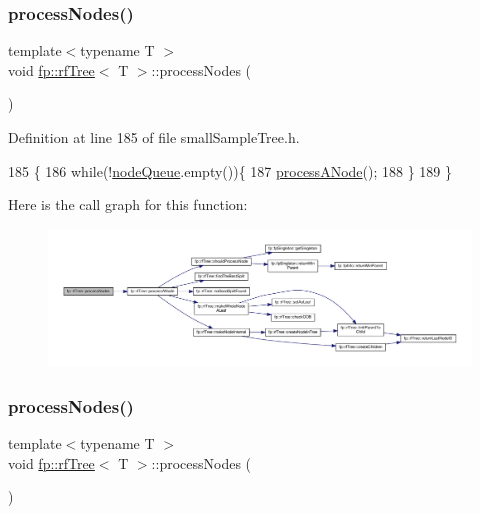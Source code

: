 \subsubsection{\texorpdfstring{process\+Nodes()}{processNodes()}\hspace{0.1cm}{\footnotesize\ttfamily [1/2]}}
{\footnotesize\ttfamily template$<$typename T $>$ \\
void \hyperlink{classfp_1_1rfTree}{fp\+::rf\+Tree}$<$ T $>$\+::process\+Nodes (\begin{DoxyParamCaption}{ }\end{DoxyParamCaption})\hspace{0.3cm}{\ttfamily [inline]}}



Definition at line 185 of file small\+Sample\+Tree.\+h.


\begin{DoxyCode}
185                                    \{
186                     \textcolor{keywordflow}{while}(!\hyperlink{classfp_1_1rfTree_af72d0a2f930fd480dfb4858885c2df23}{nodeQueue}.empty())\{
187                         \hyperlink{classfp_1_1rfTree_ab7760333f6857ab7ce2ee29a7bc16e65}{processANode}();
188                     \}
189                 \}
\end{DoxyCode}
Here is the call graph for this function\+:
\nopagebreak
\begin{figure}[H]
\begin{center}
\leavevmode
\includegraphics[width=350pt]{classfp_1_1rfTree_a7997df3477bc9f73163384c8cd0bcec9_cgraph}
\end{center}
\end{figure}
\mbox{\label{classfp_1_1rfTree_a7997df3477bc9f73163384c8cd0bcec9}} 
\subsubsection{\texorpdfstring{process\+Nodes()}{processNodes()}\hspace{0.1cm}{\footnotesize\ttfamily [2/2]}}
{\footnotesize\ttfamily template$<$typename T $>$ \\
void \hyperlink{classfp_1_1rfTree}{fp\+::rf\+Tree}$<$ T $>$\+::process\+Nodes (\begin{DoxyParamCaption}{ }\end{DoxyParamCaption})\hspace{0.3cm}{\ttfamily [inline]}}



